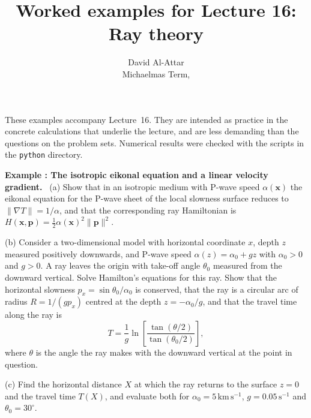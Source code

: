\documentclass[a4paper,12pt]{paper}
\title{Worked examples for Lecture 16: Ray theory}
\author{David Al-Attar \\ Michaelmas Term, \the\year}
\newcounter{example}
\renewenvironment{example}[1]{%
  \refstepcounter{example}%
  \begin{mdframed}[linewidth=1pt,innertopmargin=6pt,innerbottommargin=6pt]%
  \noindent\textbf{Example \theexample: #1.}\ }{%
  \end{mdframed}}
\begin{document}
\maketitle

\noindent These examples accompany Lecture~16. They are intended as practice in the concrete
calculations that underlie the lecture, and are less demanding than the questions on the
problem sets. Numerical results were checked with the scripts in the \texttt{python}
directory.

\begin{example}{The isotropic eikonal equation and a linear velocity gradient}
(a) Show that in an isotropic medium with P-wave speed $\alpha(\mathbf{x})$ the eikonal equation
for the P-wave sheet of the local slowness surface reduces to $\|\nabla T\|=1/\alpha$, and that the
corresponding ray Hamiltonian is $H(\mathbf{x},\mathbf{p})=\frac{1}{2}\alpha(\mathbf{x})^{2}\|\mathbf{p}\|^{2}$.

\noindent (b) Consider a two-dimensional model with horizontal coordinate $x$, depth $z$ measured
positively downwards, and P-wave speed $\alpha(z)=\alpha_{0}+gz$ with $\alpha_{0}>0$ and $g>0$.
A ray leaves the origin with take-off angle $\theta_{0}$ measured from the downward vertical.
Solve Hamilton's equations for this ray. Show that the horizontal slowness
$p_{x}=\sin\theta_{0}/\alpha_{0}$ is conserved, that the ray is a circular arc of radius
$R=1/(gp_{x})$ centred at the depth $z=-\alpha_{0}/g$, and that the travel time along the ray is
\begin{equation*}
T=\frac{1}{g}\ln\left[\frac{\tan(\theta/2)}{\tan(\theta_{0}/2)}\right],
\end{equation*}
where $\theta$ is the angle the ray makes with the downward vertical at the point in question.

\noindent (c) Find the horizontal distance $X$ at which the ray returns to the surface $z=0$ and the
travel time $T(X)$, and evaluate both for $\alpha_{0}=5\,\mathrm{km\,s^{-1}}$, $g=0.05\,\mathrm{s^{-1}}$
and $\theta_{0}=30^{\circ}$.
\end{example}
\end{document}
